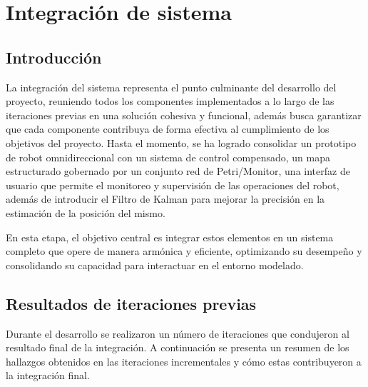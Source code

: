 \newpage
\chapter{Integración de sistema}

\section{Introducción}

La integración del sistema representa el punto culminante del desarrollo del proyecto, reuniendo todos los componentes implementados a lo largo de las iteraciones previas en una solución cohesiva y funcional, además busca garantizar que cada componente contribuya de forma efectiva al cumplimiento de los objetivos del proyecto. Hasta el momento, se ha logrado consolidar un prototipo de robot omnidireccional con un sistema de control compensado, un mapa estructurado gobernado por un conjunto red de Petri/Monitor, una interfaz de usuario que permite el monitoreo y supervisión de las operaciones del robot, además de introducir el Filtro de Kalman para mejorar la precisión en la estimación de la posición del mismo.

En esta etapa, el objetivo central es integrar estos elementos en un sistema completo que opere de manera armónica y eficiente, optimizando su desempeño y consolidando su capacidad para interactuar en el entorno modelado.

\section{Resultados de iteraciones previas}

Durante el desarrollo se realizaron un número de iteraciones que condujeron al resultado final de la integración. A continuación se presenta un resumen de los hallazgos obtenidos en las iteraciones incrementales y cómo estas contribuyeron a la integración final.

